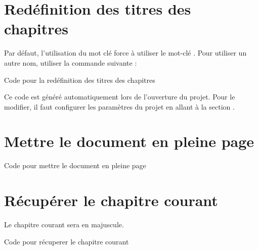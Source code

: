\section{Redéfinition des titres des chapitres}

Par défaut, l'utilisation du mot clé  force à utiliser le mot-clé . Pour utiliser un autre nom, utiliser la commande suivante : 

\begin{Latex}{Code pour la redéfinition des titres des chapitres}
\end{Latex}
Ce code est généré automatiquement lors de l'ouverture du projet. Pour le modifier, il faut configurer les paramètres du projet en allant à la section .



\section{Mettre le document en pleine page}
\begin{Latex}{Code pour mettre le document en pleine page}
\setFullPage
\end{Latex}

\section{Récupérer le chapitre courant}

Le chapitre courant sera en majuscule.
\begin{Latex}{Code pour récuperer le chapitre courant}
\currentChapter
\end{Latex}


